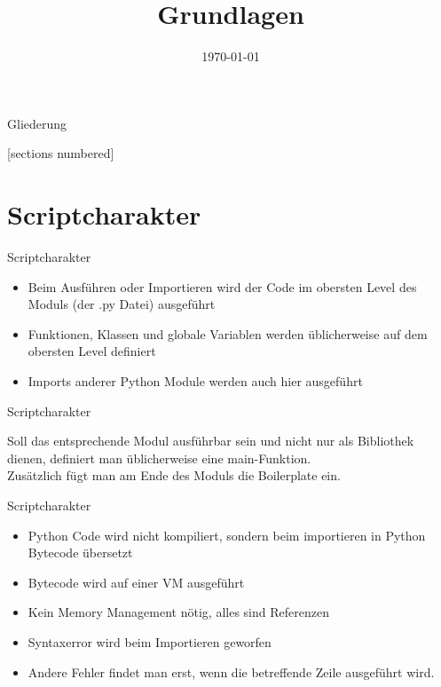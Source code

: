 



\title{Grundlagen}
\date{\today}




\maketitle

\begin{frame}{Gliederung}
	\begin{multicols}{2}
		[sections numbered]
		\tableofcontents
	\end{multicols}
\end{frame}



\section{Scriptcharakter}
\begin{frame}[fragile]{Scriptcharakter}
	\begin{itemize}
		\item Beim Ausführen oder Importieren wird der Code im obersten Level des Moduls (der .py Datei) ausgeführt
		\item Funktionen, Klassen und globale Variablen werden üblicherweise auf dem obersten Level definiert
		\item Imports anderer Python Module werden auch hier ausgeführt
	\end{itemize}
\end{frame}

\begin{frame}[fragile]{Scriptcharakter}
	 
	Soll das entsprechende Modul ausführbar sein und nicht nur als Bibliothek dienen, definiert man üblicherweise eine \alert{main}-Funktion.\\
	Zus\"atzlich f\"ugt man am Ende des Moduls die Boilerplate ein.\\
\end{frame}

\begin{frame}{Scriptcharakter}
	\begin{itemize}
		\item Python Code wird nicht kompiliert, sondern beim importieren in Python Bytecode übersetzt
		\item Bytecode wird auf einer VM ausgeführt
		\item Kein Memory Management nötig, alles sind Referenzen
		\item Syntaxerror wird beim Importieren geworfen
		\item Andere Fehler findet man erst, wenn die betreffende Zeile ausgeführt wird.
	\end{itemize}
\end{frame}



